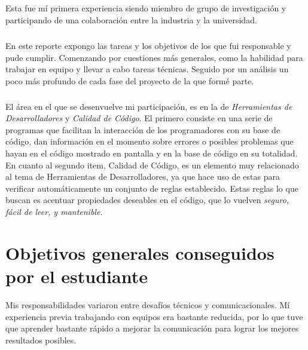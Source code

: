 \documentclass[12pt]{extreport} %
\begin{document}
\paragraph{}
Esta fue mí primera experiencia siendo miembro de grupo de
investigación y participando de una colaboración entre la industria
y la universidad.

\paragraph{}
En este reporte expongo las tareas y los objetivos de los que fui
responsable y pude cumplir. Comenzando por cuestiones más generales,
como la habilidad para trabajar en equipo y llevar a cabo tareas
técnicas. Seguido por un análisis un poco más profundo de cada fase
del proyecto de la que formé parte.

\paragraph{}
El área en el que se desenvuelve mi participación, es en la de
\emph{Herramientas de Desarrolladores} y \emph{Calidad de Código}. El
primero consiste en una serie de programas que facilitan la
interacción de los programadores con su base de código, dan
información en el momento sobre errores o posibles problemas que hayan
en el código mostrado en pantalla y en la base de código en su
totalidad. En cuanto al segundo item, Calidad de Código, es un
elemento muy relacionado al tema de Herramientas de Desarrolladores,
ya que hace uso de estas para verificar automáticamente un conjunto de
reglas establecido. Estas reglas lo que buscan es acentuar propiedades
deseables en el código, que lo vuelven \emph{seguro, fácil de leer, y
mantenible}.


\chapter{Objetivos generales conseguidos por el estudiante}

Mis responsabilidades variaron entre desafíos técnicos y
comunicacionales. Mí experiencia previa trabajando con equipos era
bastante reducida, por lo que tuve que aprender bastante rápido a
mejorar la comunicación para lograr los mejores resultados posibles.
\end{document}
